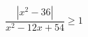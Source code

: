 \begin{ex}[type=inequality]
	\begin{condition}
		\( \dfrac{|x^2-36|}{x^2-12x+54}\ge1 \)
	\end{condition}
	\answer{\( \{ 3 \}\cup\left[ \dfrac{15}{2};+\infty \right) \)}
\end{ex}
